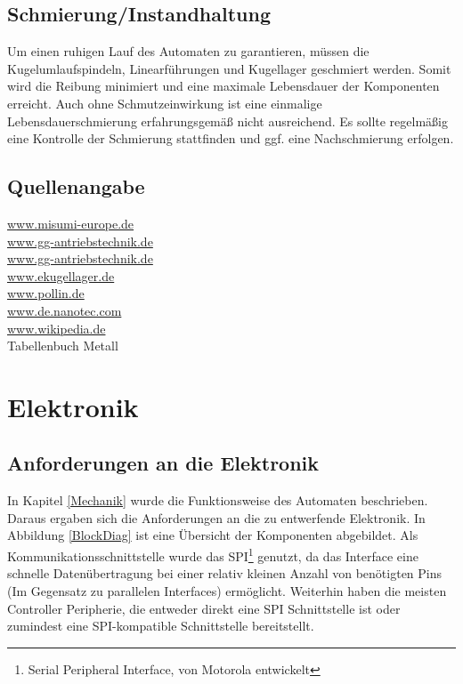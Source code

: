 \documentclass{scrartcl}
\begin{document}
\subsection{Schmierung/Instandhaltung}

Um einen ruhigen Lauf des Automaten zu garantieren, müssen die Kugelumlaufspindeln, Linearführungen und Kugellager geschmiert werden. Somit wird die Reibung minimiert und eine maximale Lebensdauer der Komponenten erreicht. Auch ohne Schmutzeinwirkung ist eine einmalige Lebensdauerschmierung erfahrungsgemäß nicht ausreichend. Es sollte regelmäßig eine Kontrolle der Schmierung stattfinden und ggf. eine Nachschmierung erfolgen.

\subsection{Quellenangabe}

\url{www.misumi-europe.de}\\
\url{www.gg-antriebstechnik.de}\\
\url{www.gg-antriebstechnik.de}\\
\url{www.ekugellager.de}\\
\url{www.pollin.de}\\
\url{www.de.nanotec.com}\\
\url{www.wikipedia.de}\\
Tabellenbuch Metall

\newpage


\section{Elektronik}
\subsection{Anforderungen an die Elektronik}
In Kapitel \ref{Mechanik} wurde die Funktionsweise des Automaten beschrieben. Daraus ergaben sich die Anforderungen an die zu entwerfende Elektronik. In Abbildung \ref{BlockDiag} ist eine Übersicht der Komponenten abgebildet. Als Kommunikationsschnittstelle wurde das SPI\footnote{Serial Peripheral Interface, von Motorola entwickelt} genutzt, da das Interface eine schnelle Datenübertragung bei einer relativ kleinen Anzahl von benötigten Pins (Im Gegensatz zu parallelen Interfaces) ermöglicht. Weiterhin haben die meisten Controller Peripherie, die entweder direkt eine SPI Schnittstelle ist oder zumindest eine SPI-kompatible Schnittstelle bereitstellt.
\end{document}
